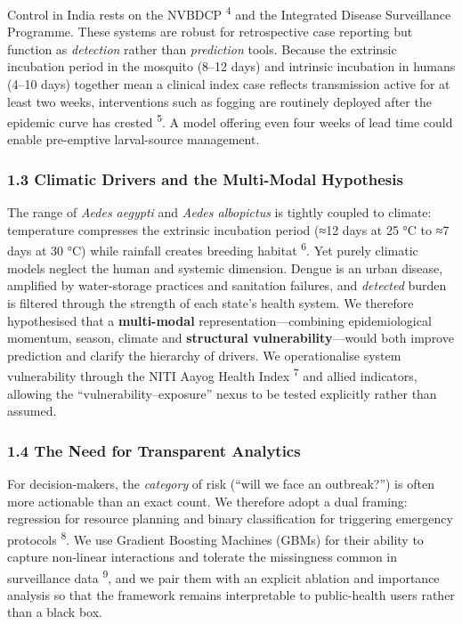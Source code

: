 \documentclass[
  10pt,
  twocolumn]{article}
\begin{document}
Control in India rests on the NVBDCP \textsuperscript{4} and the
Integrated Disease Surveillance Programme. These systems are robust for
retrospective case reporting but function as \emph{detection} rather
than \emph{prediction} tools. Because the extrinsic incubation period in
the mosquito (8--12 days) and intrinsic incubation in humans (4--10
days) together mean a clinical index case reflects transmission active
for at least two weeks, interventions such as fogging are routinely
deployed after the epidemic curve has crested \textsuperscript{5}. A
model offering even four weeks of lead time could enable pre-emptive
larval-source management.

\subsubsection{1.3 Climatic Drivers and the Multi-Modal
Hypothesis}\label{climatic-drivers-and-the-multi-modal-hypothesis}

The range of \emph{Aedes aegypti} and \emph{Aedes albopictus} is tightly
coupled to climate: temperature compresses the extrinsic incubation
period (≈12 days at 25 °C to ≈7 days at 30 °C) while rainfall creates
breeding habitat \textsuperscript{6}. Yet purely climatic models neglect
the human and systemic dimension. Dengue is an urban disease, amplified
by water-storage practices and sanitation failures, and \emph{detected}
burden is filtered through the strength of each state's health system.
We therefore hypothesised that a \textbf{multi-modal}
representation---combining epidemiological momentum, season, climate and
\textbf{structural vulnerability}---would both improve prediction and
clarify the hierarchy of drivers. We operationalise system vulnerability
through the NITI Aayog Health Index \textsuperscript{7} and allied
indicators, allowing the ``vulnerability--exposure'' nexus to be tested
explicitly rather than assumed.

\subsubsection{1.4 The Need for Transparent
Analytics}\label{the-need-for-transparent-analytics}

For decision-makers, the \emph{category} of risk (``will we face an
outbreak?'') is often more actionable than an exact count. We therefore
adopt a dual framing: regression for resource planning and binary
classification for triggering emergency protocols \textsuperscript{8}.
We use Gradient Boosting Machines (GBMs) for their ability to capture
non-linear interactions and tolerate the missingness common in
surveillance data \textsuperscript{9}, and we pair them with an explicit
ablation and importance analysis so that the framework remains
interpretable to public-health users rather than a black box.
\end{document}
